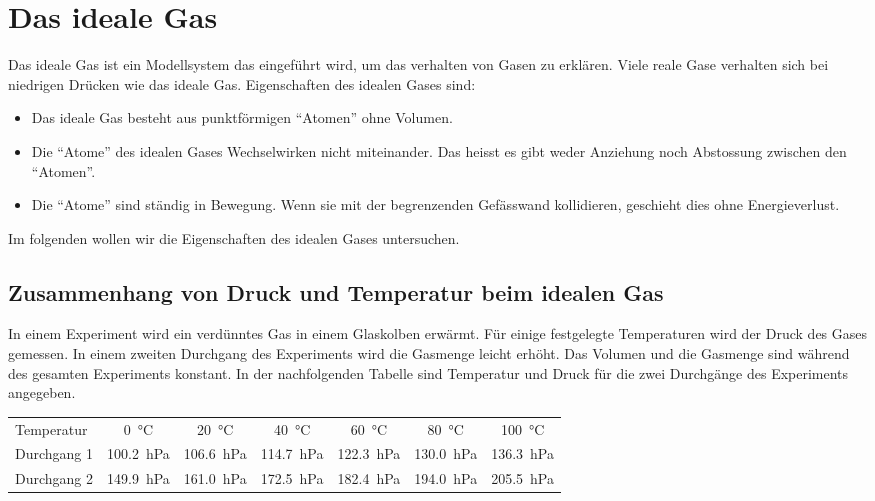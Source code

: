 \documentclass[12pt,a4paper,twoside]{article}
\begin{document}
\section*{Das ideale Gas}
Das ideale Gas ist ein Modellsystem das eingeführt wird, um das verhalten von Gasen zu erklären.
Viele reale Gase verhalten sich bei niedrigen Drücken wie das ideale Gas.
Eigenschaften des idealen Gases sind:
\begin{itemize}
	\item Das ideale Gas besteht aus punktförmigen ``Atomen'' ohne Volumen.
	\item Die ``Atome'' des idealen Gases Wechselwirken nicht miteinander. 
		Das heisst es gibt weder Anziehung noch Abstossung zwischen den ``Atomen''.
	\item Die ``Atome'' sind ständig in Bewegung. Wenn sie mit der begrenzenden Gefässwand kollidieren, 
		geschieht dies ohne Energieverlust.
\end{itemize}

Im folgenden wollen wir die Eigenschaften des idealen Gases untersuchen.

\subsection*{Zusammenhang von Druck und Temperatur beim idealen Gas}
In einem Experiment wird ein verdünntes Gas in einem Glaskolben erwärmt.
Für einige festgelegte Temperaturen wird der Druck des Gases gemessen.
In einem zweiten Durchgang des Experiments wird die Gasmenge leicht erhöht.
Das Volumen und die Gasmenge sind während des gesamten Experiments konstant.
In der nachfolgenden Tabelle sind Temperatur und Druck für die zwei Durchgänge des Experiments angegeben.

\begin{center}
\begin{tabular}{lcccccc}
Temperatur &		\SI{0}{\celsius} & \SI{20}{\celsius} & \SI{40}{\celsius} & \SI{60}{\celsius} & \SI{80}{\celsius} & \SI{100}{\celsius}\\
Durchgang 1 &  \SI{100.2}{hPa}         & \SI{106.6}{hPa}   & \SI{114.7}{hPa}   & \SI{122.3}{hPa}   & \SI{130.0}{hPa}   & \SI{136.3}{hPa}\\
Durchgang 2 &  \SI{149.9}{hPa}	     & \SI{161.0}{hPa}   & \SI{172.5}{hPa}   & \SI{182.4}{hPa}   & \SI{194.0}{hPa}   & \SI{205.5}{hPa}\\
\end{tabular}
\end{center}
\end{document}
